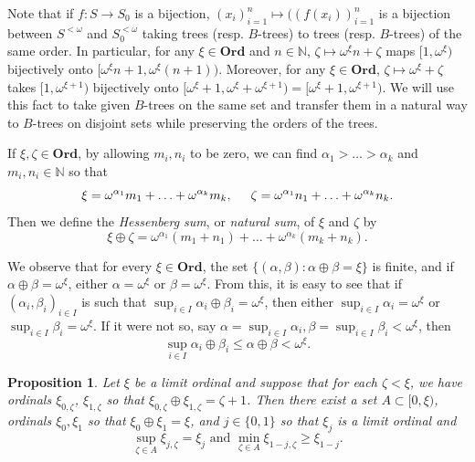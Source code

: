 \documentclass[12pt]{amsart}
\newtheorem{proposition}[theorem]{Proposition}
\theoremstyle{definition}
\newcommand{\ord}{\textbf{Ord}}
\newcommand{\nn}{\mathbb{N}}
\begin{document}
Note that if $f:S\to S_0$ is a bijection, $(x_i)_{i=1}^n\mapsto ((f(x_i))_{i=1}^n$ is a bijection between $S^{<\omega}$ and $S_0^{<\omega}$ taking trees (resp. $B$-trees) to trees (resp. $B$-trees) of the same order.  In particular, for any $\xi\in \ord$ and $n\in \nn$, $\zeta\mapsto \omega^\xi n+ \zeta$ maps $[1, \omega^\xi)$ bijectively onto $[\omega^\xi n+1, \omega^\xi (n+1))$.  Moreover, for any $\xi\in \ord$, $\zeta\mapsto \omega^\xi+\zeta$ takes $[1, \omega^{\xi+1})$ bijectively onto $[\omega^\xi+1, \omega^\xi+\omega^{\xi+1})=[\omega^\xi+1, \omega^{\xi+1})$.  We will use this fact to take given $B$-trees on the same set and transfer them in a natural way to $B$-trees on disjoint sets while preserving the orders of the trees.  








If $\xi, \zeta\in \ord$, by allowing $m_i,n_i$ to be zero, we can find $\alpha_1>\ldots >\alpha_k$ and $m_i, n_i\in \nn$ so that $$\xi=\omega^{\alpha_1}m_1+\ldots + \omega^{\alpha_k} m_k, \hspace{5mm} \zeta= \omega^{\alpha_1}n_1+\ldots + \omega^{\alpha_k}n_k.$$  Then we define the \emph{Hessenberg sum}, or \emph{natural sum}, of $\xi$ and $\zeta $ by $$\xi\oplus \zeta= \omega^{\alpha_1}(m_1+n_1)+\ldots + \omega^{\alpha_k}(m_k+n_k).$$  
 
 We observe that for every $\xi\in \ord$, the set $\{(\alpha, \beta): \alpha\oplus \beta=\xi\}$ is finite, and if $\alpha\oplus \beta=\omega^\xi$, either $\alpha=\omega^\xi$ or $\beta=\omega^\xi$.  From this, it is easy to see that if $(\alpha_i, \beta_i)_{i\in I}$ is such that $\sup_{i\in I} \alpha_i \oplus \beta_i=\omega^\xi$, then either $\sup_{i\in I} \alpha_i=\omega^\xi$ or $\sup_{i\in I} \beta_i= \omega^\xi$.  If it were not so, say $\alpha= \sup_{i\in I}\alpha_i, \beta=\sup_{i\in I}\beta_i<\omega^\xi$, then $$\sup_{i\in I} \alpha_i\oplus \beta_i\leqslant \alpha\oplus \beta < \omega^\xi.$$  
 


\begin{proposition} Let $\xi$ be a limit ordinal and suppose that for each $\zeta<\xi$, we have ordinals $\xi_{0, \zeta}$, $\xi_{1,\zeta}$ so that $\xi_{0,\zeta}\oplus \xi_{1, \zeta}=\zeta+1$.  Then there exist a set $A\subset [0,\xi)$, ordinals $\xi_0, \xi_1$ so that $\xi_0\oplus \xi_1=\xi$, and $j\in \{0,1\}$ so that $\xi_j$ is a limit ordinal and $$\sup_{\zeta\in A} \xi_{j,\zeta}= \xi_j \text{\ and\ }\min_{\zeta\in A}\xi_{1-j, \zeta} \geqslant \xi_{1-j}.$$  

\label{splitting technique}

\end{proposition}
\end{document}
